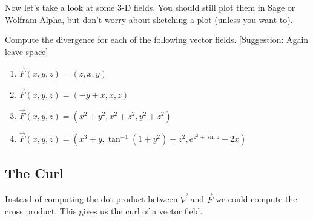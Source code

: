 Now let's take a look at some 3-D fields. You should still plot them in Sage or Wolfram-Alpha, but don't worry about sketching a plot (unless you want to).

\begin{problem}\label{3d_div}
Compute the divergence for each of the following vector fields. [Suggestion: Again leave space]
\begin{enumerate}
 \item $\vec F(x,y,z) = \left(z,x,y \right)$
 \item $\vec F(x,y,z) = \left(-y+x,x,z \right)$
 \item $\vec F(x,y,z) = \left(x^2+y^2,x^2+z^2,y^2+z^2 \right)$
 \item $\vec F(x,y,z) = \left(x^3+y,\tan^{-1}(1+y^2) + z^2,e^{z^2+\sin z} -2x\right)$
\end{enumerate}
\end{problem}

\subsection{The Curl}

Instead of computing the dot product between $\vec \nabla$ and $\vec F$ we could compute the cross product. This gives us the curl of a vector field.\\

